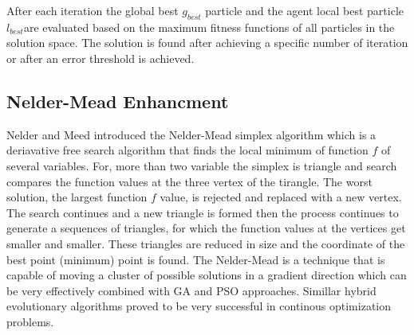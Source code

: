 \documentclass[a4paper,twoside]{article}
\begin{document}
 After each iteration the global best $g_{best}$ particle and the agent local best particle $l_{best}$are evaluated based on the maximum fitness functions of all particles in the solution space. The solution is found after achieving a specific number of iteration or after an error threshold is achieved. 
% 
 \subsection{Nelder-Mead Enhancment}

Nelder and Meed introduced the Nelder-Mead simplex algorithm which is a deriavative free  search algorithm that finds the local minimum of  function $f$ of several variables. For, more than two variable the simplex is triangle and search compares  the function values at the three vertex of the tirangle. The worst solution, the largest function $f$ value, is rejected and replaced with a new vertex. The search continues and a new triangle is formed then the process continues to generate a sequences of triangles, for which the function values at the vertices get smaller and smaller. These triangles are reduced in size and the coordinate of the best point (minimum) point is found.  The Nelder-Mead is a technique that is capable of moving a cluster of possible solutions in a gradient direction which can be very effectively combined with GA and PSO approaches. Simillar hybrid evolutionary algorithms proved to be very successful in continous optimization problems. 


\end{document}
